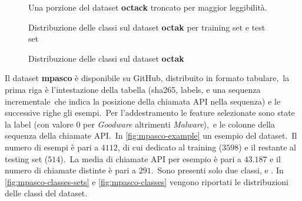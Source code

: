 \begin{figure}[htbp]
    \centering
    \begin{minipage}[t]{0.2\textwidth}
        \centering
        \inputminted[fontsize=\small]{text}{validazione-empirica/files/octak-labels.txt}
    \end{minipage}%
    \hfill
    \begin{minipage}[t]{0.75\textwidth} %
        \centering
        \inputminted[fontsize=\small]{text}{validazione-empirica/files/octak-calls.csv}
    \end{minipage}
    \caption{Una porzione del dataset \textbf{octack} troncato per maggior leggibilità.}
    \label{fig:octck-example}
\end{figure}

\begin{figure}[h!]
    \centering
    \caption{Distribuzione delle classi sul dataset \textbf{octak} per training set e test set}
    \label{fig:octak-classes-sets}
\end{figure}

\begin{figure}[h!]
    \centering
    \caption{Distribuzione delle classi sul dataset \textbf{octak}}
    \label{fig:octak-classes}
\end{figure}

\FloatBarrier


Il dataset \textbf{mpasco} è disponibile su GitHub, distribuito in formato tabulare,\
la prima riga è l'intestazione della tabella (sha265, labels, e una sequenza incrementale\
che indica la posizione della chiamata API nella sequenza) e le successive righe gli esempi.\
Per l'addestramento le feature selezionate sono state la label (con valore $0$ per \textit{Goodware} altrimenti \textit{Malware}),\
e le colonne della sequenza della chiamate API.\
In \autoref{fig:mpasco-example} un esempio del dataset.\
Il numero di esempi è pari a $4112$, di cui  dedicato al training ($3598$) e il restante  al testing set ($514$).\
La media di chiamate API per esempio è pari a $43.187$ e il numero di chiamate distinte è pari a $291$.\
Sono presenti solo due classi,  e .
In \autoref{fig:mpasco-classes-sets} e \autoref{fig:mpasco-classes} vengono riportati le distribuzioni delle classi del dataset.

